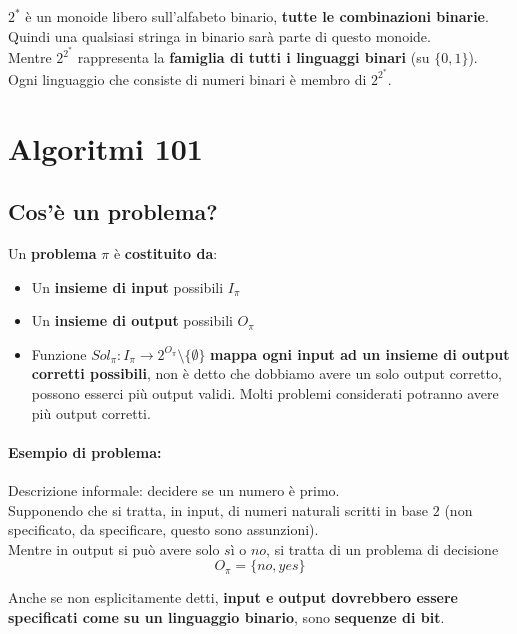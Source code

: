 \documentclass[11pt]{article}
\begin{document}
	$2^\ast$ è un monoide libero sull'alfabeto binario, \textbf{tutte le combinazioni binarie}. Quindi una qualsiasi stringa in binario sarà parte di questo monoide.\\
	
	Mentre $2^{2^\ast}$ rappresenta la \textbf{famiglia di tutti i linguaggi binari} (su $\{0,1\}$).\\
	Ogni linguaggio che consiste di numeri binari è membro di $2^{2^\ast}$.\\
	
	\newpage
	
	\section{Algoritmi 101}
	
	\subsection{Cos'è un problema?} 
	
	Un \textbf{problema} $\pi$ è \textbf{costituito da}:
	\begin{itemize}
		\item Un \textbf{insieme di input} possibili $I_\pi$
		
		\item Un \textbf{insieme di output} possibili $O_\pi$
		
		\item Funzione $Sol_\pi: I_\pi \rightarrow 2^{O_\pi} \setminus \{\emptyset\}$ \textbf{mappa ogni input ad un insieme di output corretti possibili}, non è detto che dobbiamo avere un solo output corretto, possono esserci più output validi. Molti problemi considerati potranno avere più output corretti.
	\end{itemize}
	
	\paragraph{Esempio di problema:} Descrizione informale: decidere se un numero è primo. \\
	
	Supponendo che si tratta, in input, di numeri naturali scritti in base $2$ (non specificato, da specificare, questo sono assunzioni).\\
	Mentre in output si può avere solo $sì$ o $no$, si tratta di un problema di decisione
	$$ O_\pi = \{no, yes\} $$
	
	Anche se non esplicitamente detti, \textbf{input e output dovrebbero essere specificati come su un linguaggio binario}, sono \textbf{sequenze di bit}.\\
	
\end{document}
